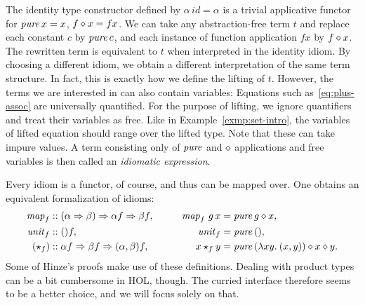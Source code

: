 The identity type constructor defined by $\alpha\,\mathit{id} = \alpha$ is a
trivial applicative functor for $\operatorname{\mathit{pure}}{x} = x$, $f \diamond x = f x$.
We can take any abstraction-free term $t$ and replace each constant $c$ by
$\operatorname{\mathit{pure}}{c}$, and each instance of function application $f x$ by $f \diamond x$.
The rewritten term is equivalent to $t$ when interpreted in the identity idiom.
By choosing a different idiom, we obtain a different interpretation of the same
term structure.
In fact, this is exactly how we define the lifting of $t$.
However, the terms we are interested in can also contain variables:
Equations such as~\eqref{eq:plus-assoc} are universally quantified.
For the purpose of lifting, we ignore quantifiers and treat their variables
as free.
Like in Example~\ref{exmp:set-intro}, the variables of lifted equation should
range over the lifted type.
Note that these can take impure values.
A term consisting only of $\operatorname{\mathit{pure}}$ and $\diamond$ applications and free variables is
then called an \emph{idiomatic expression}.

Every idiom is a functor, of course, and thus can be mapped over.
One obtains an equivalent formalization of idioms:
\begin{alignat*}{2}
	\mathit{map}_f &\mathrel{::} (\alpha \Rightarrow \beta) \Rightarrow \alpha f \Rightarrow \beta f, &\qquad
		\operatorname{\mathit{map}}_f\,g\,x &= \operatorname{\mathit{pure}} g \diamond x, \\
	\mathit{unit}_f &\mathrel{::} () f, &\qquad \mathit{unit}_f &= \operatorname{\mathit{pure}}{()}, \\
	(\star_f) &\mathrel{::} \alpha f \Rightarrow \beta f \Rightarrow (\alpha, \beta) f, &\qquad
		x \star_f y &= \operatorname{\mathit{pure}}{(\lambda x y.\>(x,y))} \diamond x \diamond y.
\end{alignat*}
Some of Hinze's proofs make use of these definitions.
Dealing with product types can be a bit cumbersome in HOL, though.
The curried interface therefore seems to be a better choice, and we will
focus solely on that.
